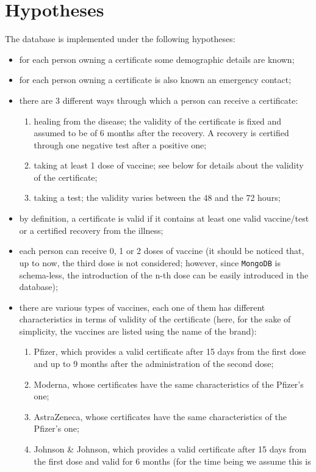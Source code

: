 \documentclass{article}
\begin{document}
\section{Hypotheses} \label{hypotheses}
The database is implemented under the following hypotheses:
\begin{itemize}
    \item for each person owning a certificate some demographic details are known;
    \item for each person owning a certificate is also known an emergency contact;
    \item there are 3 different ways through which a person can receive a certificate:
    \begin{enumerate}
        \item healing from the disease; the validity of the certificate is fixed and assumed to be of 6 months after the recovery. A recovery is certified through one negative test after a positive one;
        \item taking at least 1 dose of vaccine; see below for details about the validity of the certificate;
        \item taking a test; the validity varies between the 48 and the 72 hours;
    \end{enumerate}
    \item by definition, a certificate is valid if it contains at least one valid vaccine/test or a certified recovery from the illness;
    \item each person can receive 0, 1 or 2 doses of vaccine (it should be noticed that, up to now, the third dose is not considered; however, since \verb|MongoDB| is schema-less, the introduction of the n-th dose can be easily introduced in the database);
\item there are various types of vaccines, each one of them has different characteristics in terms of validity of the certificate (here, for the sake of simplicity, the vaccines are listed using the name of the brand):
\begin{enumerate}
    \item Pfizer, which provides a valid certificate after 15 days from the first dose and up to 9 months after the administration of the second dose;
    \item Moderna, whose certificates have the same characteristics of the Pfizer's one;
    \item AstraZeneca, whose certificates have the same characteristics of the Pfizer's one;
    \item Johnson \& Johnson, which provides a valid certificate after 15 days from the first dose and valid for 6 months (for the time being we assume this is 

\end{enumerate}
\end{itemize}
\end{document}

